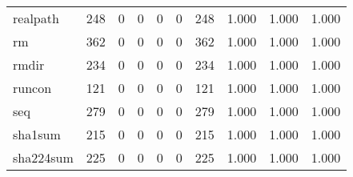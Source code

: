 \begin{longtable}{lp{1.3cm}p{1.3cm}p{1.3cm}p{1.3cm}p{1.3cm}p{1.3cm}p{1.3cm}p{1.3cm}p{1.3cm}}
realpath  &                    248 &                                  0 &                                 0 &                                0 &                                 0 &                             248 &                                   1.000 &                                  1.000 &                                1.000 \\
rm        &                    362 &                                  0 &                                 0 &                                0 &                                 0 &                             362 &                                   1.000 &                                  1.000 &                                1.000 \\
rmdir     &                    234 &                                  0 &                                 0 &                                0 &                                 0 &                             234 &                                   1.000 &                                  1.000 &                                1.000 \\
runcon    &                    121 &                                  0 &                                 0 &                                0 &                                 0 &                             121 &                                   1.000 &                                  1.000 &                                1.000 \\
seq       &                    279 &                                  0 &                                 0 &                                0 &                                 0 &                             279 &                                   1.000 &                                  1.000 &                                1.000 \\
sha1sum   &                    215 &                                  0 &                                 0 &                                0 &                                 0 &                             215 &                                   1.000 &                                  1.000 &                                1.000 \\
sha224sum &                    225 &                                  0 &                                 0 &                                0 &                                 0 &                             225 &                                   1.000 &                                  1.000 &                                1.000 \\

\end{longtable}
